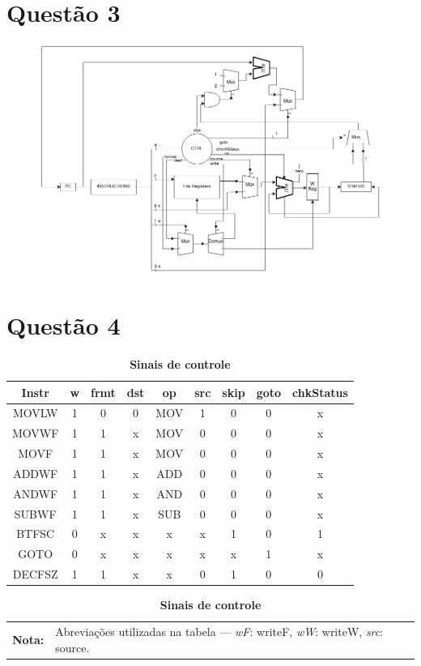 \documentclass[12pt]{report}
\begin{document}
	\section*{Questão 3}
		\begin{figure}[H]
			\centering
			\includegraphics{datapath.png}
		\end{figure}
	\clearpage
	\section*{Questão 4}
		\begin{table}[ht]
			\centering
			\caption{\textbf{Sinais de controle}}
			\begin{tabular}{ccccccccc}
				\toprule
				\textbf{Instr} & \textbf{w} & \textbf{frmt} & \textbf{dst} & \textbf{op} & \textbf{src} & \textbf{skip} & \textbf{goto} & \textbf{chkStatus} \\
				\midrule
				MOVLW & 1 & 0 & 0 & MOV & 1 & 0 & 0 & x \\
				MOVWF & 1 & 1 & x & MOV & 0 & 0 & 0 & x \\
				MOVF & 1 & 1 & x & MOV & 0 & 0 & 0 & x \\
				ADDWF & 1 & 1 & x & ADD & 0 & 0 & 0 & x \\
				ANDWF & 1 & 1 & x & AND & 0 & 0 & 0 & x \\
				SUBWF & 1 & 1 & x & SUB & 0 & 0 & 0 & x \\
				BTFSC & 0 & x & x & x & x & 1 & 0 & 1 \\
				GOTO & 0 & x & x & x & x & x & 1 & x \\
				DECFSZ & 1 & 1 & x & x & 0 & 1 & 0 & 0 \\
				\bottomrule
			\end{tabular}\label{tab:Sinais de controle}
			\begin{tabularx}{\textwidth}{l X}
				\textbf{Nota:} & Abreviações utilizadas na tabela --- \textit{wF}: writeF, \textit{wW}: writeW, \textit{src}: source.
			\end{tabularx}
		\end{table}
\end{document}
